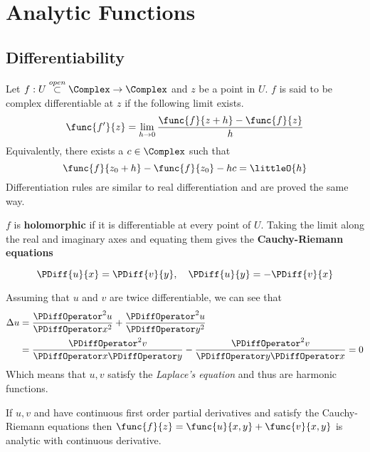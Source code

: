 \chapter{Analytic Functions}
\section{Differentiability}
Let \(f: U \overset{open}{\subset} \Complex \to \Complex\) and \(z\) be a point in \(U\). \(f\) is said to be complex differentiable at \(z\) if the following limit exists.
\begin{equation*}
      \func{f'}{z} = \lim_{h \to 0} \dfrac{\func{f}{z + h} - \func{f}{z}}{h}
\end{equation*}
Equivalently, there exists a \(c \in \Complex\) such that 
    \begin{equation} 
        \func{f}{z_0 + h} - \func{f}{z_0} - hc = \littleO{h} 
\end{equation}
Differentiation rules are similar to real differentiation and are proved the same way. 

\(f\) is \textbf{holomorphic} if it is differentiable at every point of \(U\). Taking the limit along the real and imaginary axes and equating them gives the \textbf{Cauchy-Riemann equations}

\begin{equation*}
      \PDiff{u}{x} = \PDiff{v}{y} ,\quad \PDiff{u}{y} = - \PDiff{v}{x}
\end{equation*}

Assuming that \(u\) and \(v\) are twice differentiable, we can see that 
\begin{align*}
      \Delta u &= \dfrac{\PDiffOperator^2 u}{\PDiffOperator x^2} + \dfrac{\PDiffOperator^2 u}{\PDiffOperator y^2}\\
      &= \dfrac{\PDiffOperator^2 v}{\PDiffOperator x \PDiffOperator y} - \dfrac{\PDiffOperator^2 v}{\PDiffOperator y \PDiffOperator x} = 0
\end{align*}
Which means that \(u,v\) satisfy the \textit{Laplace's equation} and thus are harmonic functions. 

\begin{theorem}
      If \(u,v\) and have continuous first order partial derivatives and satisfy the Cauchy-Riemann equations then \(\func{f}{z} = \func{u}{x,y} + \func{v}{x,y}\) is analytic with continuous derivative.
\end{theorem}

